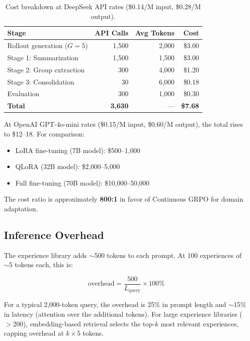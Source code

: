 \documentclass[11pt,letterpaper]{article}
\begin{document}
\begin{table}[t]
\centering
\begin{tabular}{lrrr}
\toprule
\textbf{Stage} & \textbf{API Calls} & \textbf{Avg Tokens} & \textbf{Cost} \\
\midrule
Rollout generation ($G=5$) & 1{,}500 & 2{,}000 & \$3.00 \\
Stage 1: Summarization & 1{,}500 & 1{,}500 & \$3.00 \\
Stage 2: Group extraction & 300 & 4{,}000 & \$1.20 \\
Stage 3: Consolidation & 30 & 6{,}000 & \$0.18 \\
Evaluation & 300 & 1{,}000 & \$0.30 \\
\midrule
\textbf{Total} & \textbf{3{,}630} & --- & \textbf{\$7.68} \\
\bottomrule
\end{tabular}
\caption{Cost breakdown at DeepSeek API rates (\$0.14/M input, \$0.28/M output).}
\label{tab:cost}
\end{table}

At OpenAI GPT-4o-mini rates (\$0.15/M input, \$0.60/M output), the total rises to \$12--18.  For comparison:

\begin{itemize}
    \item LoRA fine-tuning (7B model): \$500--1{,}000
    \item QLoRA (32B model): \$2{,}000--5{,}000
    \item Full fine-tuning (70B model): \$10{,}000--50{,}000
\end{itemize}

The cost ratio is approximately \textbf{800:1} in favor of Continuous GRPO for domain adaptation.

\subsection{Inference Overhead}

The experience library adds $\sim$500 tokens to each prompt.  At 100 experiences of $\sim$5 tokens each, this is:

\begin{equation}
    \text{overhead} = \frac{500}{L_{\text{query}}} \times 100\%
\end{equation}

For a typical 2{,}000-token query, the overhead is 25\% in prompt length and $\sim$15\% in latency (attention over the additional tokens).  For large experience libraries ($>$200), embedding-based retrieval selects the top-$k$ most relevant experiences, capping overhead at $k \times 5$ tokens.
\end{document}

